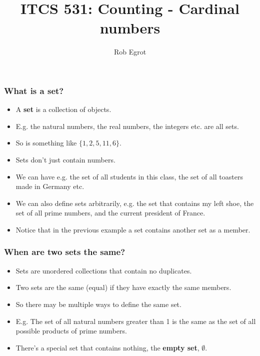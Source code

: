 \documentclass[handout]{beamer}
\title{ITCS 531: Counting - Cardinal numbers}
\date{}
\author{Rob Egrot}
\begin{document}
\begin{frame}
\titlepage
\end{frame}

\begin{frame}
\frametitle{What is a set?}
\begin{itemize}
\item A \textbf{set} is a collection of objects.
\vspace{0.2cm}
\item E.g. the natural numbers, the real numbers, the integers etc. are all sets.
\vspace{0.2cm}
\item So is something like $\{1,2,5,11,6\}$.
\vspace{0.2cm}
\item Sets don't just contain numbers.
\vspace{0.2cm}
\item We can have e.g. the set of all students in this class, the set of all toasters made in Germany etc.
\vspace{0.2cm}
\item We can also define sets arbitrarily, e.g. the set that contains my left shoe, the set of all prime numbers, and the current president of France.
\vspace{0.2cm}
\item Notice that in the previous example a set contains another set as a member.
\end{itemize}
\end{frame}

\begin{frame}
\frametitle{When are two sets the same?}
\begin{itemize}
\item Sets are unordered collections that contain no duplicates.
\vspace{0.4cm}
\item Two sets are the same (equal) if they have exactly the same members.
\vspace{0.4cm}
\item So there may be multiple ways to define the same set.
\vspace{0.4cm}
\item E.g. The set of all natural numbers greater than 1 is the same as the set of all possible products of prime numbers.
\vspace{0.4cm}
\item There's a special set that contains nothing, the \textbf{empty set}, $\emptyset$.
\end{itemize}
\end{frame}
\end{document}
